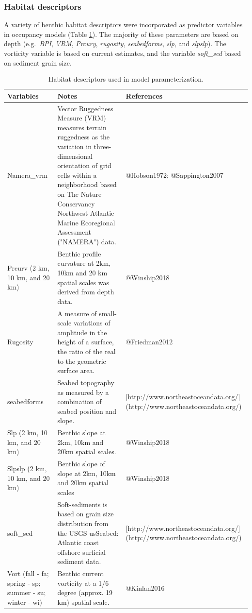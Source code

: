 \documentclass[
]{book}
\begin{document}
\hypertarget{habitat-descriptors}{%
\subsubsection{Habitat descriptors}\label{habitat-descriptors}}

A variety of benthic habitat descriptors were incorporated as predictor variables in occupancy models (Table \ref{tab:habitatdesc}). The majority of these parameters are based on depth (e.g.~\emph{BPI}, \emph{VRM}, \emph{Prcury}, \emph{rugosity}, \emph{seabedforms}, \emph{slp}, and \emph{slpslp}). The vorticity variable is based on current estimates, and the variable \emph{soft\_sed} based on sediment grain size.

\begin{landscape}\begin{table}

\caption{\label{tab:habitatdesc}Habitat descriptors used in model parameterization.}
\centering
\fontsize{8}{10}\selectfont
\begin{tabular}[t]{lll}
\toprule
Variables & Notes & References\\
\midrule
Namera\_vrm & Vector Ruggedness Measure (VRM) measures terrain ruggedness as the variation in three-dimensional orientation of grid cells within a neighborhood based on The Nature Conservancy Northwest Atlantic Marine Ecoregional Assessment ("NAMERA") data. & @Hobson1972; @Sappington2007\\
Prcurv (2 km, 10 km, and 20 km) & Benthic profile curvature at 2km, 10km and 20 km spatial scales was derived from depth data. & @Winship2018\\
Rugosity & A measure of small-scale variations of amplitude in the height of a surface, the ratio of the real to the geometric surface area. & @Friedman2012\\
seabedforms & Seabed topography as measured by a combination of seabed position and slope. & [http://www.northeastoceandata.org/](http://www.northeastoceandata.org/)\\
Slp (2 km, 10 km, and 20 km) & Benthic slope at 2km, 10km and 20km spatial scales. & @Winship2018\\
\addlinespace
Slpslp (2 km, 10 km, and 20 km) & Benthic slope of slope at 2km, 10km and 20km spatial scales & @Winship2018\\
soft\_sed & Soft-sediments is based on grain size distribution from the USGS usSeabed: Atlantic coast offshore surficial sediment data. & [http://www.northeastoceandata.org/](http://www.northeastoceandata.org/)\\
Vort (fall - fa; spring - sp; summer - su; winter - wi) & Benthic current vorticity at a 1/6 degree (approx. 19 km) spatial scale. & @Kinlan2016\\
\bottomrule
\end{tabular}
\end{table}
\end{landscape}
\end{document}
